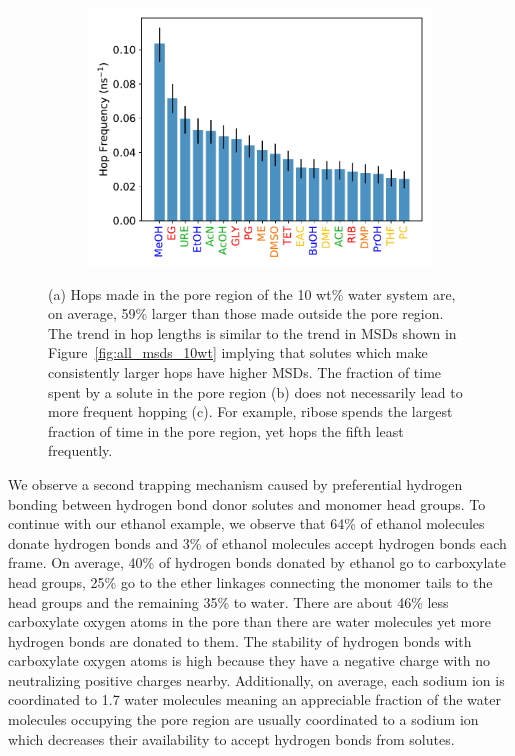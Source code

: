 \documentclass[journal=jpcbfk,manuscript=article]{achemso}
\begin{document}
\begin{figure}
\begin{subfigure}{0.325\textwidth}
  \includegraphics[width=\textwidth]{hopfreq_total.pdf}
  \caption{}\label{fig:hopfreq}
  \end{subfigure}
  \caption{(a) Hops made in the pore region of the 10 wt\% water system 
  are, on average, 59\% larger than those made outside the pore region. 
  The trend in hop lengths is similar to the trend in MSDs shown in 
  Figure~\ref{fig:all_msds_10wt} implying that solutes which make consistently 
  larger hops have higher MSDs. The fraction of time spent by a solute in the 
  pore region (b) does not necessarily lead to more frequent hopping (c). For
  example, ribose spends the largest fraction of time in the pore region, yet
  hops the fifth least frequently.}\label{fig:hops}
  \end{figure}
  
  We observe a second trapping mechanism caused by preferential hydrogen 
  bonding between hydrogen bond donor solutes and monomer head groups. To 
  continue with our ethanol example, we observe that 64\% of ethanol
  molecules donate hydrogen bonds
  and 3\% of ethanol molecules accept hydrogen bonds each frame. On average, 40\%
  of hydrogen bonds donated by ethanol go to carboxylate 
  head groups, 25\% go to the ether linkages connecting the monomer tails to the 
  head groups and the remaining 35\% to water. There are about 46\% less 
  carboxylate oxygen atoms in the pore than there are water molecules yet more
  hydrogen bonds are donated to them. The stability of hydrogen bonds with 
  carboxylate oxygen atoms is high because they have a negative charge
  with no neutralizing positive charges nearby. Additionally, on average, 
  each sodium ion is coordinated to 1.7 water molecules meaning an appreciable
  fraction of the water molecules occupying the pore region are usually 
  coordinated to a sodium ion which decreases their availability to accept 
  hydrogen bonds from solutes.
  
\end{document}

